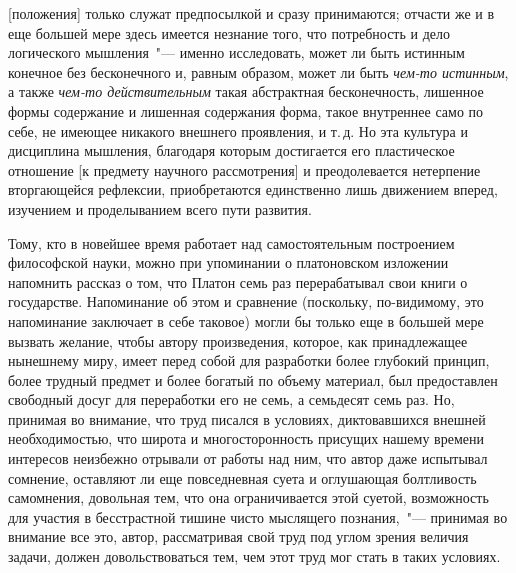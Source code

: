 [положения] только служат предпосылкой и сразу принимаются;
отчасти же и в еще большей мере здесь имеется
незнание того, что потребность и дело логического мышления~"---
именно исследовать, может ли быть истинным
конечное без бесконечного и, равным образом, может ли
быть \emph{чем-то истинным}, а также \emph{чем-то действительным}
такая абстрактная бесконечность, лишенное формы содержание
и лишенная содержания форма, такое внутреннее
само по себе, не имеющее никакого внешнего проявления,
и т.\,д. Но эта культура и дисциплина мышления, благодаря
которым достигается его пластическое отношение
[к предмету научного рассмотрения] и преодолевается
нетерпение вторгающейся рефлексии, приобретаются
единственно лишь движением вперед, изучением и проделыванием
всего пути развития.


Тому, кто в новейшее время работает над самостоятельным
построением философской науки, можно при
упоминании о платоновском изложении напомнить рассказ
о том, что Платон семь раз перерабатывал свои книги
о государстве. Напоминание об этом и сравнение (поскольку,
по-видимому, это напоминание заключает в себе
таковое) могли бы только еще в большей мере вызвать
желание, чтобы автору произведения, которое, как принадлежащее
нынешнему миру, имеет перед собой для
разработки более глубокий принцип, более трудный предмет
и более богатый по объему материал, был предоставлен
свободный досуг для переработки его не семь, а семьдесят
семь раз. Но, принимая во внимание, что труд
писался в условиях, диктовавшихся внешней необходимостью,
что широта и многосторонность присущих нашему
времени интересов неизбежно отрывали от работы
над ним, что автор даже испытывал сомнение, оставляют
ли еще повседневная суета и оглушающая болтливость
самомнения, довольная тем, что она ограничивается этой
суетой, возможность для участия в бесстрастной тишине
чисто мыслящего познания,~"--- принимая во внимание все
это, автор, рассматривая свой труд под углом зрения
величия задачи, должен довольствоваться тем, чем этот
труд мог стать в таких условиях.

\signature{Берлин, 7 ноября 1831\,г.}


